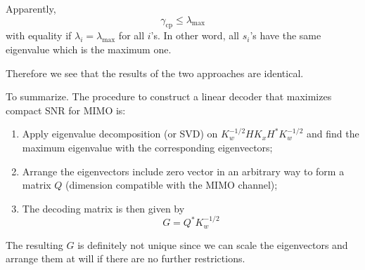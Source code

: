 \documentclass[12pt]{article}
\theoremstyle{definition}
\begin{document}
Apparently, 
$$\gamma_{\mbox{cp}}\leq \lambda_{\mbox{max}}$$
with equality if $\lambda_i=\lambda_{\mbox{max}}$ for all $i$'s. In other word, all $s_i$'s have the same eigenvalue which is the maximum one.

Therefore we see that the results of the two approaches are identical.

To summarize. The procedure to construct a linear decoder that maximizes compact SNR for MIMO is:
\begin{enumerate}
	\item Apply eigenvalue decomposition (or SVD) on $K_w^{-1/2}HK_xH^*K_w^{-1/2}$ and find the maximum eigenvalue with the corresponding eigenvectors;
	\item Arrange the eigenvectors include zero vector in an arbitrary way to form a matrix $Q$ (dimension compatible with the MIMO channel);
	\item The decoding matrix is then given by
	$$G=Q^*K_w^{-1/2}$$
\end{enumerate}

The resulting $G$ is definitely not unique since we can scale the eigenvectors and arrange them at will if there are no further restrictions.
\end{document}
